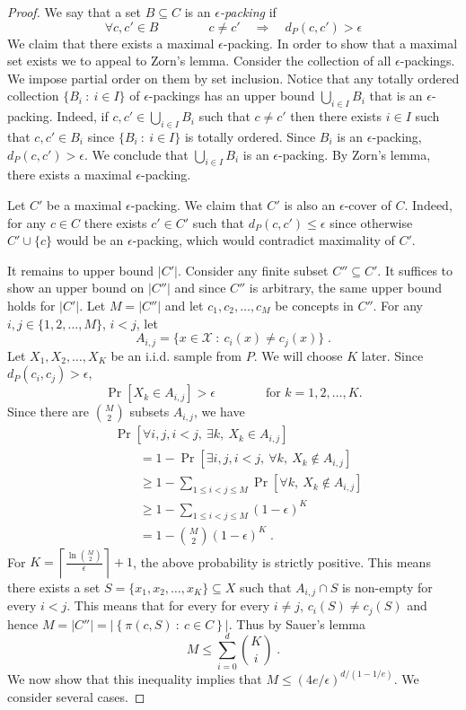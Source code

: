 \documentclass[11pt]{article}
\newcommand{\X}{\mathcal{X}}
\begin{document}
\begin{proof}
We say that a set $B \subseteq C$ is an \emph{$\epsilon$-packing} if
$$
\forall c,c' \in B \qquad \qquad c \neq c' \quad \Longrightarrow \quad d_P(c,c') > \epsilon
$$
We claim that there exists a maximal $\epsilon$-packing. In order to show that a
maximal set exists we to appeal to Zorn's lemma. Consider the collection of all
$\epsilon$-packings. We impose partial order on them by set inclusion. Notice
that any totally ordered collection $\{ B_i ~:~ i \in I \}$ of
$\epsilon$-packings has an upper bound $\bigcup_{i \in I} B_i$ that is an
$\epsilon$-packing. Indeed, if $c,c' \in \bigcup_{i \in I} B_i$ such that $c
\neq c'$ then there exists $i \in I$ such that $c,c' \in B_i$ since $\{ B_i ~:~
i \in I \}$ is totally ordered. Since $B_i$ is an $\epsilon$-packing, $d_P(c,c') >
\epsilon$. We conclude that $\bigcup_{i \in I} B_i$ is an $\epsilon$-packing. By
Zorn's lemma, there exists a maximal $\epsilon$-packing.

Let $C'$ be a maximal $\epsilon$-packing. We claim that $C'$ is also an
$\epsilon$-cover of $C$. Indeed, for any $c \in C$ there exists $c' \in C'$ such
that $d_P(c,c') \le \epsilon$ since otherwise $C' \cup \{c\}$ would be an
$\epsilon$-packing, which would contradict maximality of $C'$.

It remains to upper bound $|C'|$. Consider any finite subset $C'' \subseteq C'$.
It suffices to show an upper bound on $|C''|$ and since $C''$ is arbitrary, the
same upper bound holds for $|C'|$. Let $M = |C''|$ and let $c_1, c_2, \dots,
c_M$ be concepts in $C''$. For any $i,j \in \{1,2,\dots,M\}$, $i < j$, let
$$
A_{i,j} = \{ x \in \X ~:~ c_i(x) \neq c_j(x) \} \; .
$$
Let $X_1, X_2, \dots, X_K$ be an i.i.d. sample from $P$. We will choose $K$ later.
Since $d_P(c_i, c_j) > \epsilon$,
$$
\Pr[X_k \in A_{i,j}] > \epsilon \qquad \qquad \text{for $k=1,2,\dots,K$}.
$$
Since there are $\binom{M}{2}$ subsets $A_{i,j}$, we have
\begin{align*}
& \Pr\left[\forall i,j, i < j, \ \exists k, \ X_k \in A_{i,j} \right] \\
& \qquad = 1 - \Pr\left[\exists i,j, i < j, \ \forall k, \ X_k \not \in A_{i,j} \right] \\
& \qquad \ge 1 - \sum_{1 \le i < j \le M} \Pr\left[\forall k, \ X_k \not \in A_{i,j} \right] \\
& \qquad \ge 1 - \sum_{1 \le i < j \le M} (1 - \epsilon)^K \\
& \qquad = 1 - \binom{M}{2} (1 - \epsilon)^K \; .
\end{align*}
For $K = \left\lceil \frac{\ln \binom{M}{2}}{\epsilon} \right\rceil +
1$, the above probability is strictly positive. This means there exists a set $S =
\{x_1, x_2, \dots, x_K\} \subseteq X$ such that $A_{i,j} \cap S$ is non-empty
for every $i < j$. This means that for every for every $i \neq j$, $c_i(S) \neq
c_j(S)$ and hence $M = |C''| = \left| \left\{ \pi(c, S) ~:~ c \in C \right\} \right|$.
Thus by Sauer's lemma
$$
M \le \sum_{i=0}^d \binom{K}{i} \; .
$$
We now show that this inequality implies that $M \le (4e/\epsilon)^{d/(1-1/e)}$. We consider several cases.


\end{proof}
\end{document}
